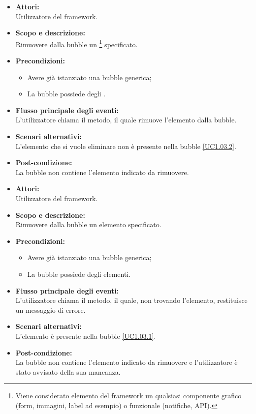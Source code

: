 \begin{itemize}
	\item \textbf{Attori:}
	\\Utilizzatore del framework.
	\item \textbf{Scopo e descrizione:}
	\\Rimuovere dalla bubble un \footnote{Viene considerato elemento del framework un qualsiasi componente grafico (form, immagini, label ad esempio) o funzionale (notifiche, API).} specificato.
	\item \textbf{Precondizioni:}
	\begin{itemize}
		\item Avere già istanziato una bubble generica;
		\item La bubble possiede degli .
	\end{itemize}
	\item \textbf{Flusso principale degli eventi:}
	\\L'utilizzatore chiama il metodo, il quale rimuove l'elemento dalla bubble.
	\item \textbf{Scenari alternativi:}
	\\L'elemento che si vuole eliminare non è presente nella bubble \ref{UC1.03.2}.
	\item \textbf{Post-condizione:}
	\\La bubble non contiene l'elemento indicato da rimuovere.
\end{itemize}


\begin{itemize}
	\item \textbf{Attori:}
	\\Utilizzatore del framework.
	\item \textbf{Scopo e descrizione:} 
	\\Rimuovere dalla bubble un elemento specificato.
	\item \textbf{Precondizioni:}
	\begin{itemize}
		\item Avere già istanziato una bubble generica;
		\item La bubble possiede degli elementi.
	\end{itemize}
	\item \textbf{Flusso principale degli eventi:}
	\\L'utilizzatore chiama il metodo, il quale, non trovando l'elemento, restituisce un messaggio di errore.
	\item \textbf{Scenari alternativi:}
	\\L'elemento è presente nella bubble \ref{UC1.03.1}.
	\item \textbf{Post-condizione:}
	\\La bubble non contiene l'elemento indicato da rimuovere e l'utilizzatore è stato avvisato della sua mancanza.
\end{itemize}

